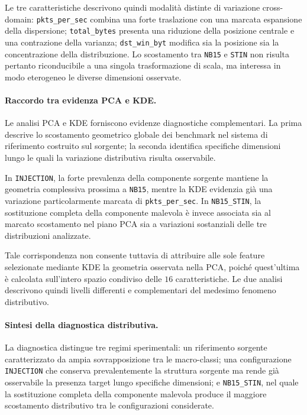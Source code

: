 Le tre caratteristiche descrivono quindi modalità distinte di variazione cross-domain: \newline \texttt{pkts\_per\_sec} combina una forte traslazione con una marcata espansione della dispersione; \texttt{total\_bytes} presenta una riduzione della posizione centrale e una contrazione della varianza; \texttt{dst\_win\_byt} modifica sia la posizione sia la concentrazione della distribuzione. 
Lo scostamento tra \texttt{NB15} e \texttt{STIN} non risulta pertanto riconducibile a una singola trasformazione di scala, ma interessa in modo eterogeneo le diverse dimensioni osservate.

\paragraph{Raccordo tra evidenza PCA e KDE.}
Le analisi PCA e KDE forniscono evidenze diagnostiche complementari. 
La prima descrive lo scostamento geometrico globale dei benchmark nel sistema di riferimento costruito sul sorgente; la seconda identifica specifiche dimensioni lungo le quali la variazione distributiva risulta osservabile.

In \texttt{INJECTION}, la forte prevalenza della componente sorgente mantiene la geometria complessiva prossima a \texttt{NB15}, mentre la KDE evidenzia già una variazione particolarmente marcata di \texttt{pkts\_per\_sec}. 
In \texttt{NB15\_STIN}, la sostituzione completa della componente malevola è invece associata sia al marcato scostamento nel piano PCA sia a variazioni sostanziali delle tre distribuzioni analizzate.

Tale corrispondenza non consente tuttavia di attribuire alle sole feature selezionate mediante KDE la geometria osservata nella PCA, poiché quest'ultima è calcolata sull'intero spazio condiviso delle $16$ caratteristiche. 
Le due analisi descrivono quindi livelli differenti e complementari del medesimo fenomeno distributivo.

\paragraph{Sintesi della diagnostica distributiva.}
La diagnostica distingue tre regimi sperimentali: un riferimento sorgente caratterizzato da ampia sovrapposizione tra le macro-classi; una configurazione \texttt{INJECTION} che conserva prevalentemente la struttura sorgente ma rende già osservabile la presenza target lungo specifiche dimensioni; e \texttt{NB15\_STIN}, nel quale la sostituzione completa della componente malevola produce il maggiore scostamento distributivo tra le configurazioni considerate.

